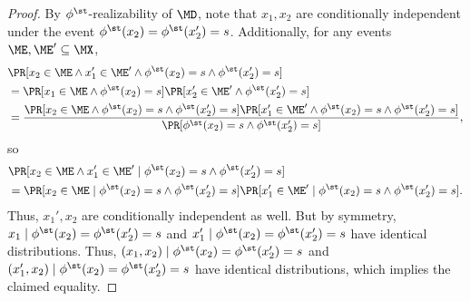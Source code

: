 \begin{proof}
By $\phi^\st$-realizability of $\MD$, note that $x_1,x_2$ are conditionally independent under the event $\phi^\st(x_2)=\phi^\st(x_2')=s$. Additionally, for any events $\ME,\ME' \subseteq \MX$, 
\begin{align*}
&\Pr[x_2 \in \ME \land x_1' \in \ME' \land \phi^\st(x_2) = s \land \phi^\st(x_2') = s] \\
&= \Pr[x_1 \in \ME \land \phi^\st(x_2) = s] \Pr[x_2' \in \ME' \land \phi^\st(x_2') = s] \\ 
&= \frac{\Pr[x_2 \in \ME \land \phi^\st(x_2) = s \land \phi^\st(x_2') = s] \Pr[x_1' \in \ME' \land \phi^\st(x_2) = s \land \phi^\st(x_2') = s]}{\Pr[\phi^\st(x_2) = s \land \phi^\st(x_2') = s]},
\end{align*}
so 
\begin{align*}
&\Pr[x_2 \in \ME \land x_1' \in \ME' \mid{} \phi^\st(x_2) = s \land \phi^\st(x_2') = s] \\ 
&= \Pr[x_2 \in \ME \mid{} \phi^\st(x_2) = s \land \phi^\st(x_2') = s]\Pr[x_1' \in \ME' \mid{} \phi^\st(x_2) = s \land \phi^\st(x_2') = s].
\end{align*}
Thus, $x_1',x_2$ are conditionally independent as well. But by symmetry, $x_1\mid{}\phi^\st(x_2)=\phi^\st(x_2') = s$ and $x_1'\mid{}\phi^\st(x_2)=\phi^\st(x_2') = s$ have identical distributions. Thus, $(x_1,x_2)\mid{}\phi^\st(x_2)=\phi^\st(x_2') = s$ and $(x_1',x_2)\mid{}\phi^\st(x_2)=\phi^\st(x_2') = s$ have identical distributions, which implies the claimed equality.
\end{proof}


\iffalse 
\dhruv{Explicit proof:
\begin{align*}
&\sum_{s_1,s_1',x_1,x_2,x_1',x_2'} \til p(s_1, s) \til p(s_1',s) \til q(x_1|s_1) \til q(x_1'|s_1') \til q(x_2|s) \til q(x_2' | s) g(x_1, x_2) \\
&= \sum_{s_1,s_1',x_1,x_2} \til p(s_1, s) \til p(s_1',s) \til q(x_1|s_1)  \til q(x_2|s) g(x_1, x_2)
\end{align*}

\begin{align*}
&\sum_{s_1,s_1',x_1,x_2,x_1',x_2'} \til p(s_1, s) \til p(s_1',s) \til q(x_1|s_1) \til q(x_1'|s_1') \til q(x_2|s) \til q(x_2' | s) g(x_1', x_2) \\
&=\sum_{s_1,s_1',x_2,x_1'} \til p(s_1, s) \til p(s_1',s) \til q(x_1'|s_1') \til q(x_2|s) g(x_1', x_2)\\
&=\sum_{s_1,s_1',x_2,x_1'} \til p(s_1', s) \til p(s_1,s) \til q(x_1'|s_1) \til q(x_2|s) g(x_1', x_2) \\ 
&=\sum_{s_1,s_1',x_2,x_1} \til p(s_1', s) \til p(s_1,s) \til q(x_1|s_1) \til q(x_2|s) g(x_1, x_2)
\end{align*}
}\fi

